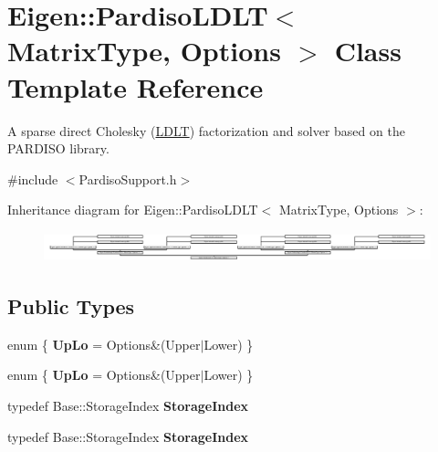 \hypertarget{class_eigen_1_1_pardiso_l_d_l_t}{}\section{Eigen\+:\+:Pardiso\+L\+D\+LT$<$ Matrix\+Type, Options $>$ Class Template Reference}
\label{class_eigen_1_1_pardiso_l_d_l_t}


A sparse direct Cholesky (\hyperlink{group___cholesky___module_class_eigen_1_1_l_d_l_t}{L\+D\+LT}) factorization and solver based on the P\+A\+R\+D\+I\+SO library.  




{\ttfamily \#include $<$Pardiso\+Support.\+h$>$}

Inheritance diagram for Eigen\+:\+:Pardiso\+L\+D\+LT$<$ Matrix\+Type, Options $>$\+:\begin{figure}[H]
\begin{center}
\leavevmode
\includegraphics[height=0.877193cm]{class_eigen_1_1_pardiso_l_d_l_t}
\end{center}
\end{figure}
\subsection*{Public Types}
\begin{DoxyCompactItemize}
\item 
\mbox{\label{class_eigen_1_1_pardiso_l_d_l_t_a67f1a3e1c9c435761fdce20e7522ecdf}} 
enum \{ {\bfseries Up\+Lo} = Options\&(Upper$\vert$\+Lower)
 \}
\item 
\mbox{\label{class_eigen_1_1_pardiso_l_d_l_t_a23d439963e75894c8cf8c215316fa406}} 
enum \{ {\bfseries Up\+Lo} = Options\&(Upper$\vert$\+Lower)
 \}
\item 
\mbox{\label{class_eigen_1_1_pardiso_l_d_l_t_ae18a83f05749b82202c0e2fabcb7a5ef}} 
typedef Base\+::\+Storage\+Index {\bfseries Storage\+Index}
\item 
\mbox{\label{class_eigen_1_1_pardiso_l_d_l_t_ae18a83f05749b82202c0e2fabcb7a5ef}} 
typedef Base\+::\+Storage\+Index {\bfseries Storage\+Index}
\end{DoxyCompactItemize}
